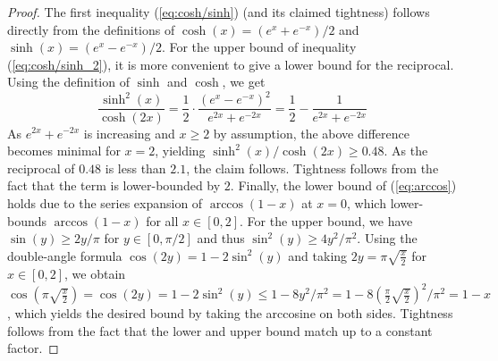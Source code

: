 \documentclass[11pt]{article}
\begin{document}
\begin{proof}
    The first inequality (\ref{eq:cosh/sinh}) (and its claimed tightness) follows directly from the definitions of $\cosh(x) = (e^x + e^{-x}) / 2$ and $\sinh(x) = (e^x - e^{-x}) / 2$.
%
    For the upper bound of inequality (\ref{eq:cosh/sinh_2}), it is more convenient to give a lower bound for the reciprocal.
    Using the definition of $\sinh$ and $\cosh$, we get
    \begin{equation*}
        \frac{\sinh^2(x)}{\cosh(2x)} =
        \frac{1}{2} \cdot \frac{(e^x - e^{-x})^2}{e^{2x} + e^{-2x}} =
        \frac{1}{2} - \frac{1}{e^{2x} + e^{-2x}}
    \end{equation*}
    As $e^{2x} + e^{-2x}$ is increasing and $x \ge 2$ by assumption, the above difference becomes minimal for $x = 2$, yielding $\sinh^2(x) / \cosh(2x) \ge 0.48$.  As the reciprocal of $0.48$ is less than $2.1$, the claim follows.  Tightness follows from the fact that the term is lower-bounded by $2$.
%
    Finally, the lower bound of (\ref{eq:arccos}) holds due to the series expansion of $ \arccos(1-x) $ at $ x = 0 $, which lower-bounds $ \arccos(1-x) $ for all $ x \in [0,2] $.
    For the upper bound, we have $ \sin(y) \geq 2y/\pi $ for $ y \in [0, \pi/2] $ and thus $ \sin^2(y) \geq 4y^2/\pi^2 $.
    Using the double-angle formula $ \cos(2y) = 1 - 2 \sin^2(y) $ and taking $ 2y = \pi \sqrt{\frac{x}{2}} $ for $ x \in [0, 2] $, we obtain 
    $ \cos(\pi \sqrt{\frac{x}{2}}) 
    = \cos(2y) 
    = 1 - 2 \sin^2(y) 
    \leq 1 - 8y^2/\pi^2
    = 1 - 8 (\frac{\pi}{2} \sqrt{\frac{x}{2}})^2 / \pi^2
    = 1 - x $,
    which yields the desired bound by taking the arccosine on both sides.  Tightness follows from the fact that the lower and upper bound match up to a constant factor.
\end{proof}
\end{document}
